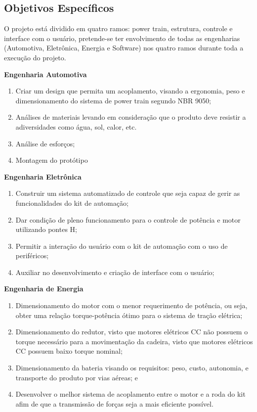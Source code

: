 \subsection{Objetivos Específicos}

O projeto está dividido em quatro ramos: power train, estrutura, controle e interface com o usuário, pretende-se ter envolvimento de todas as engenharias (Automotiva, Eletrônica, Energia e Software) nos quatro ramos durante toda a execução do projeto.

\textbf{Engenharia Automotiva}

  \begin{enumerate}
    \item Criar um design que permita um acoplamento, visando a ergonomia, peso e dimensionamento do sistema de power train segundo NBR 9050;
    \item Análises de materiais levando em consideração que o produto deve resistir a adiversidades como água, sol, calor, etc.
    \item Análise de esforços;
    \item Montagem do protótipo
  \end{enumerate}

\textbf{Engenharia Eletrônica}
  \begin{enumerate}
    \item Construir um sistema automatizado de controle que seja capaz de gerir as funcionalidades do kit de automação;
    \item Dar condição de pleno funcionamento para o controle de potência e motor utilizando pontes H;
    \item Permitir a interação do usuário com o kit de automação com o uso de periféricos;
    \item Auxiliar no desenvolvimento e criação de interface com o usuário;
  \end{enumerate}

\textbf{Engenharia de Energia}
  \begin{enumerate}
    \item Dimensionamento do motor com o menor requerimento de potência, ou seja, obter uma relação torque-potência ótimo para o sistema de tração elétrica;
    \item Dimensionamento do redutor, visto que motores elétricos CC não possuem o torque necessário para a movimentação da cadeira, visto que motores elétricos CC possuem baixo torque nominal;
    \item Dimensionamento da bateria visando os requisitos: peso, custo, autonomia, e transporte do produto por vias aéreas; e
    \item Desenvolver o melhor sistema de acoplamento entre o motor e a roda do kit afim de que a transmissão de forças seja a mais eficiente possível.
  \end{enumerate}

